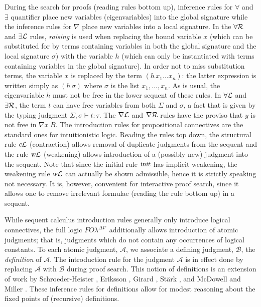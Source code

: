 \documentclass{acmtrans2m}
\def\Ascr{{\mathcal A}}
\def\Bscr{{\mathcal B}}
\newcommand{\FOL   }{FO\lambda}
\newcommand{\FOLDNb}{\FOL^{\Delta\nabla}}
\newcommand{\TSeq}[3]{#1 \vdash #2 : #3}
\newcommand{\cL}{\hbox{\sl c}{\cal L}}
\newcommand{\existsL}{\exists{\cal L}}
\newcommand{\existsR}{\exists{\cal R}}
\newcommand{\forallL}{\forall{\cal L}}
\newcommand{\forallR}{\forall{\cal R}}
\newcommand{\init}{\hbox{\sl init}}
\newcommand{\nablaL}{\nabla{\cal L}}
\newcommand{\nablaR}{\nabla{\cal R}}
\newcommand{\wL}{\hbox{\sl w}{\cal L}}
\begin{document}
During the search for proofs (reading rules bottom up), inference rules 
for $\forall$ and $\exists$ quantifier place new variables
(eigenvariables) into 
the global signature while the inference rules for $\nabla$ place new
variables into a local signature. 
In the $\forallR$ and $\existsL$ rules, {\em raising} \cite{miller92jsc} is
used when replacing the bound variable $x$ (which can be substituted for by
terms containing variables in both the global signature and the local signature
$\sigma$) with the variable $h$ (which can only be instantiated with
terms containing variables in
the global signature). In order not to miss substitution terms, the
variable $x$ is replaced by the term $(h\,x_1\dots x_n)$: the latter
expression is written simply as $(h\,\sigma)$ where $\sigma$ is the list
$x_1,\dots,x_n$.
As is usual, the eigenvariable $h$ must not be free in the lower
sequent of these rules. In $\forallL$ and $\existsR$, the term $t$ can have free
variables from both $\Sigma$ and $\sigma$, a fact that is given
by the typing judgment $\TSeq{\Sigma,\sigma}{t}{\tau}$.  
The $\nablaL$ and $\nablaR$ rules have the proviso that $y$ is 
not free in $\nabla x\ B$. The introduction rules for propositional connectives are 
the standard ones for intuitionistic logic. Reading the rules top down, 
the structural rule $\cL$ (contraction) allows removal of duplicate judgments from the sequent 
and the rule $\wL$ (weakening) allows introduction of a (possibly new) 
judgment into the sequent. Note that since the initial rule $\init$ has 
implicit weakening, the weakening rule $\wL$ can actually be shown admissible, hence
it is strictly speaking not necessary. It is, however, convenient for interactive proof
search, since it allows one to remove irrelevant formulae (reading the rule bottom up)
in a sequent.

While sequent calculus introduction rules generally only introduce
logical connectives, the full logic $\FOLDNb$ additionally allows introduction
of atomic judgments; that is, judgments which do not contain any
occurrences of logical constants.  To each atomic judgment, $\Ascr$, we
associate a defining judgment, $\Bscr$, the {\em definition} of
$\Ascr$.  The introduction rule for the judgment $\Ascr$ is in effect
done by replacing $\Ascr$ with $\Bscr$ during proof search.  This
notion of definitions is an extension of work by Schroeder-Heister
\citeyear{schroeder-heister93lics}, Eriksson \citeyear{eriksson91elp}, Girard
\citeyear{girard92mail}, St\"ark \citeyear{staerk92jfcs}, and McDowell and
Miller \citeyear{mcdowell00tcs}.  These inference rules for definitions
allow for modest reasoning about the fixed points of (recursive) definitions.
\end{document}
